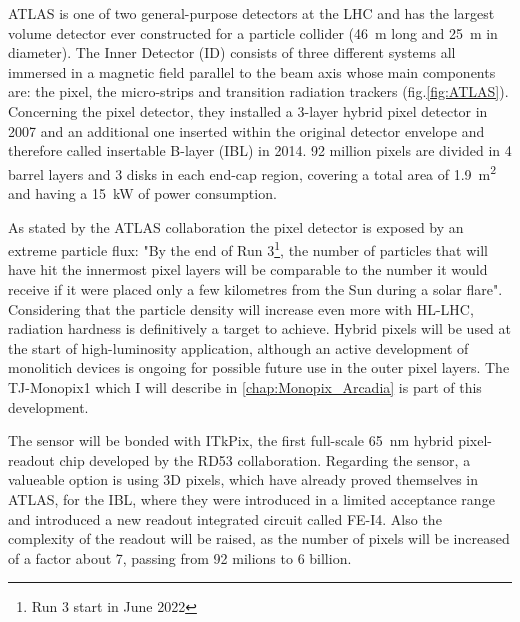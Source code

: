         ATLAS is one of two general-purpose detectors at the LHC and has the largest volume detector ever constructed for a particle collider (\SI{46}{m} long and \SI{25}{m} in diameter).  
        The Inner Detector (ID) consists of three different systems all immersed in a magnetic field parallel to the beam axis whose main components are: the pixel, the micro-strips and transition radiation trackers (fig.\ref{fig:ATLAS}). 
        Concerning the pixel detector, they installed a 3-layer hybrid pixel detector in 2007 and an additional one inserted within the original detector envelope and therefore called insertable B-layer (IBL) in 2014.
        92 million pixels are divided in 4 barrel layers and 3 disks in each end-cap region, covering a total area of \SI{1.9}{m\squared} and having a \SI{15}{kW} of power consumption. 

        As stated by the ATLAS collaboration the pixel detector is exposed by an extreme particle flux: "By the end of Run 3\footnote{Run 3 start in June 2022}, the number of particles that will have hit the innermost pixel layers will be comparable to the number it would receive if it were placed only a few kilometres from the Sun during a solar flare". Considering that the particle density will increase even more with HL-LHC, radiation hardness is definitively a target to achieve. 
        Hybrid pixels will be used at the start of high-luminosity application, although an active development of monolitich devices is ongoing for possible future use in the outer pixel layers. The TJ-Monopix1 which I will describe in \ref{chap:Monopix_Arcadia} is part of this development. 
       
        The sensor will be bonded with ITkPix, the first full-scale \SI{65}{nm} hybrid pixel-readout chip developed by the RD53 collaboration.
        Regarding the sensor, a valueable option is using 3D pixels, which have already proved themselves in ATLAS, for the IBL, where they were introduced in a limited acceptance range and introduced a new readout integrated circuit called FE-I4.  
        Also the complexity of the readout will be raised, as the number of pixels will be increased of a factor about 7, passing from 92 milions to 6 billion.
    
